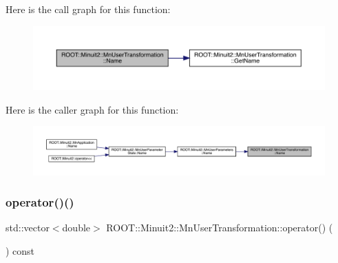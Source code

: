 Here is the call graph for this function\+:\nopagebreak
\begin{figure}[H]
\begin{center}
\leavevmode
\includegraphics[width=350pt]{d9/d98/classROOT_1_1Minuit2_1_1MnUserTransformation_a83b4e1b3d5b020b4151d5dc30ff5488a_cgraph}
\end{center}
\end{figure}
Here is the caller graph for this function\+:\nopagebreak
\begin{figure}[H]
\begin{center}
\leavevmode
\includegraphics[width=350pt]{d9/d98/classROOT_1_1Minuit2_1_1MnUserTransformation_a83b4e1b3d5b020b4151d5dc30ff5488a_icgraph}
\end{center}
\end{figure}
\mbox{\label{classROOT_1_1Minuit2_1_1MnUserTransformation_ae5f766bba2c9c99bf009e8799afc5348}} 
\subsubsection{\texorpdfstring{operator()()}{operator()()}\hspace{0.1cm}{\footnotesize\ttfamily [1/2]}}
{\footnotesize\ttfamily std\+::vector$<$double$>$ R\+O\+O\+T\+::\+Minuit2\+::\+Mn\+User\+Transformation\+::operator() (\begin{DoxyParamCaption}\item[{const \mbox{\hyperlink{namespaceROOT_1_1Minuit2_a62ed97730a1ca8d3fbaec64a19aa11c9}{Mn\+Algebraic\+Vector}} \&}]{ }\end{DoxyParamCaption}) const}

\mbox{\label{classROOT_1_1Minuit2_1_1MnUserTransformation_a5b4f45e11a5497d548e4b3e9dec95c6d}} 
